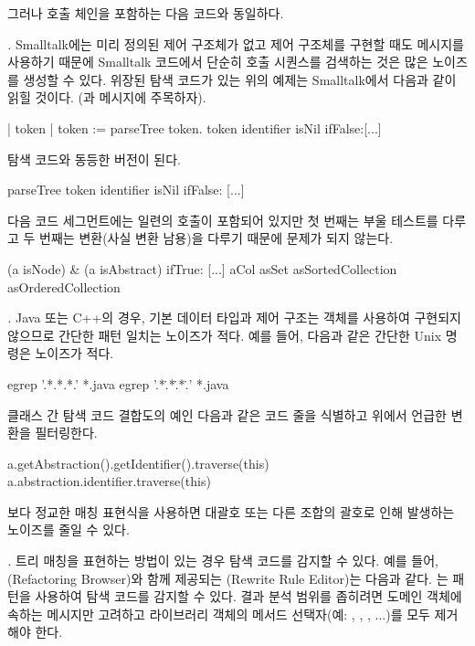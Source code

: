\documentclass[a4paper,10pt,twoside]{book}
\begin{document}
그러나 호출 체인을 포함하는 다음 코드와 동일하다.

\begin{code}
if (parseTree.token().identifier() != null) {
	...
\end{code}

\noindent
\emph{.}
Smalltalk에는 미리 정의된 제어 구조체가 없고 제어 구조체를 구현할 때도 메시지를 사용하기 때문에 Smalltalk 코드에서 단순히 호출 시퀀스를 검색하는 것은 많은 노이즈를 생성할 수 있다. 위장된 탐색 코드가 있는 위의 예제는 Smalltalk에서 다음과 같이 읽힐 것이다. (과  메시지에 주목하자).

\begin{code}
| token |
token := parseTree token.
token identifier isNil ifFalse:[...]
\end{code}

탐색 코드와 동등한 버전이 된다.

\begin{code}
parseTree token identifier isNil ifFalse: [...]
\end{code}

다음 코드 세그먼트에는 일련의 호출이 포함되어 있지만 첫 번째는 부울 테스트를 다루고 두 번째는 변환(사실 변환 남용)을 다루기 때문에 문제가 되지 않는다.

\begin{code}
(a isNode) & (a isAbstract) ifTrue: [...]
aCol asSet asSortedCollection asOrderedCollection 
\end{code}

\noindent
\emph{.}
Java 또는 C++의 경우, 기본 데이터 타입과 제어 구조는 객체를 사용하여 구현되지 않으므로 간단한 패턴 일치는 노이즈가 적다. 예를 들어, 다음과 같은 간단한 Unix 명령은 노이즈가 적다.

\begin{code}
egrep '.*\(\).*\(\).*\(\).' *.java
egrep '.*\..*\..*\..' *.java
\end{code}
\noindent
클래스 간 탐색 코드 결합도의 예인 다음과 같은 코드 줄을 식별하고 위에서 언급한 변환을 필터링한다. 


\begin{code}
a.getAbstraction().getIdentifier().traverse(this) 
a.abstraction.identifier.traverse(this)
\end{code}

보다 정교한 매칭 표현식을 사용하면 대괄호 또는 다른 조합의 괄호로 인해 발생하는 노이즈를 줄일 수 있다.

\noindent
\emph{.}
트리 매칭을 표현하는 방법이 있는 경우 탐색 코드를 감지할 수 있다. 예를 들어, (Refactoring Browser)와 함께 제공되는 (Rewrite Rule Editor)는 다음과 같다. \cite{Robe97a}는  패턴을 사용하여 탐색 코드를 감지할 수 있다. 결과 분석 범위를 좁히려면 도메인 객체에 속하는 메시지만 고려하고 라이브러리 객체의 메서드 선택자(예: , , , ...)를 모두 제거해야 한다.
\end{document}
